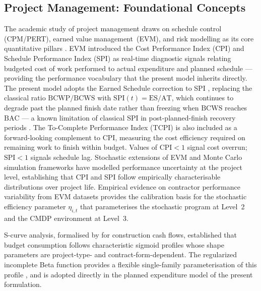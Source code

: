 
\subsection{Project Management: Foundational Concepts}
\label{subsec:lr_pm}

The academic study of project management draws on schedule control (CPM/PERT),
earned value management~(EVM), and risk modelling as its core quantitative
pillars \citep{Fleming2010, PMI2021}. EVM introduced the Cost Performance Index
(CPI) and Schedule Performance Index (SPI) as real-time diagnostic signals
relating budgeted cost of work performed to actual expenditure and planned
schedule --- providing the performance vocabulary that the present model
inherits directly. The present model adopts the Earned Schedule correction
to SPI \citep{Lipke2003}, replacing the classical ratio $\mathrm{BCWP}/\mathrm{BCWS}$
with $\mathrm{SPI}(t) = \mathrm{ES}/\mathrm{AT}$, which continues to degrade
past the planned finish date rather than freezing when $\mathrm{BCWS}$ reaches
$\mathrm{BAC}$ --- a known limitation of classical SPI in post-planned-finish
recovery periods \citep{Lipke2003, Henderson2004}. The To-Complete Performance Index
(TCPI) is also included as a forward-looking complement to CPI, measuring the cost
efficiency required on remaining work to finish within budget. Values of $\mathrm{CPI} < 1$ signal cost overrun;
$\mathrm{SPI} < 1$ signals schedule lag. Stochastic extensions of EVM \citep{Acebes2015, Batselier2017} and Monte Carlo
simulation frameworks \citep{Kwak2007} have modelled performance uncertainty at
the project level, establishing that CPI and SPI follow empirically
characterisable distributions over project life. Empirical evidence on
contractor performance variability from EVM datasets
\citep{Acebes2015, Batselier2017} provides the calibration basis for the
stochastic efficiency parameter $\eta_{i,t}$ that parameterises the stochastic
program at Level~2 and the CMDP environment at Level~3.

S-curve analysis, formalised by \citet{Kenley2009} for construction cash flows,
established that budget consumption follows characteristic sigmoid profiles
whose shape parameters are project-type- and contract-form-dependent. The
regularized incomplete Beta function provides a flexible single-family
parameterisation of this profile \citep{barraza2004probabilistic}, and is
adopted directly in the planned expenditure model of the present formulation.

